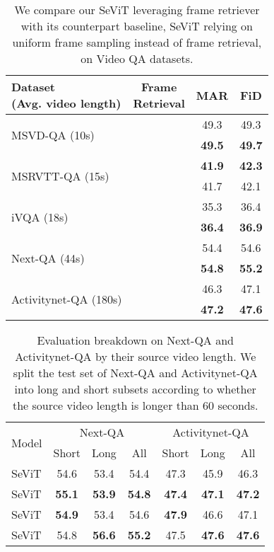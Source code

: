 \documentclass{article}
\newcommand{\cmark}{\ding{51}}\newcommand{\xmark}{\ding{55}}\DeclareMathOperator*{\argsort}{argsort}
\newcommand{\frameworkname}{SeViT}
\begin{document}
 \begin{table}[t!]
    \centering
    \small
    \caption{We compare our \frameworkname{} leveraging frame retriever with its counterpart baseline, \frameworkname{} relying on uniform frame sampling instead of frame retrieval, on Video QA datasets.}
    \vskip 0.15in
\begin{tabular}{lccc}
        \toprule
        \makecell{Dataset \\ \small{(Avg. video length)}} & \makecell{Frame \\ Retrieval} & MAR & FiD \\
        \midrule
        \multirow{2}{*}{MSVD-QA \small{(10s)}} & \xmark & 49.3 & 49.3 \\
        & \cmark & \textbf{49.5} & \textbf{49.7} \\
        \midrule
        \multirow{2}{*}{MSRVTT-QA \small{(15s)}} & \xmark & \textbf{41.9} & \textbf{42.3} \\
        & \cmark & 41.7 & 42.1 \\
        \midrule
        \multirow{2}{*}{iVQA \small{(18s)}} & \xmark & 35.3 & 36.4 \\
        & \cmark & \textbf{36.4} & \textbf{36.9} \\
        \midrule
        \multirow{2}{*}{Next-QA \small{(44s)}} & \xmark & 54.4 & 54.6 \\
        & \cmark & \textbf{54.8} & \textbf{55.2} \\
        \midrule
        \multirow{2}{*}{Activitynet-QA \small{(180s)}} & \xmark & 46.3 & 47.1 \\
        & \cmark & \textbf{47.2} & \textbf{47.6} \\
        \bottomrule
    \end{tabular}


    \label{table:comparing_selection_method}
\end{table} \begin{table}[t!]
    \centering
    \small
    \caption{Evaluation breakdown on Next-QA and Activitynet-QA by their source video length. We split the test set of Next-QA and Activitynet-QA into long and short subsets according to whether the source video length is longer than 60 seconds.}
    \vskip 0.15in
\begin{tabular}{lcccccc}
        \toprule
        \multirow{2}[3]{*}{Model} & \multicolumn{3}{c}{Next-QA} & \multicolumn{3}{c}{Activitynet-QA} \\
        \cmidrule(r){2-4}
        \cmidrule(r){5-7}
        & Short & Long & All & Short & Long & All \\
        \midrule
        \frameworkname{} & 54.6 & 53.4 & 54.4 & 47.3 & 45.9 & 46.3 \\
        \frameworkname{} & \textbf{55.1} & \textbf{53.9} & \textbf{54.8} & \textbf{47.4} & \textbf{47.1} & \textbf{47.2} \\
        \midrule
        \frameworkname{} & \textbf{54.9} & 53.4 & 54.6 & \textbf{47.9} & 46.6 & 47.1 \\
        \frameworkname{} & 54.8 & \textbf{56.6} & \textbf{55.2} & 47.5 & \textbf{47.6} & \textbf{47.6} \\
        \bottomrule
    \end{tabular}



\end{table}
\end{document}
